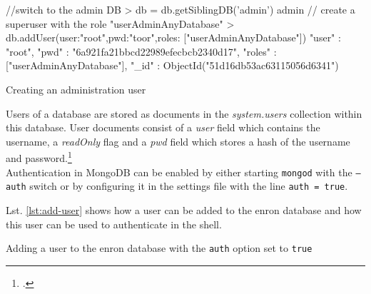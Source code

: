 \begin{listing}
    \begin{javascriptcode}
//switch to the admin DB
> db = db.getSiblingDB('admin')
admin
// create a superuser with the role "userAdminAnyDatabase"
> db.addUser({user:"root",pwd:"toor",roles: ["userAdminAnyDatabase"]})
{
	"user" : "root",
	"pwd" : "6a921fa21bbcd22989efecbcb2340d17",
	"roles" : ["userAdminAnyDatabase"],
	"_id" : ObjectId("51d16db53ac63115056d6341")
}
    \end{javascriptcode}
    \caption{Creating an administration user}
    \label{lst:mongo-root}
\end{listing}

Users of a database are stored as documents in the \textit{system.users} collection
within this database.
User documents consist of a \textit{user} field which contains the username,
a \textit{readOnly} flag and a \textit{pwd} field which stores a hash of the
username and password.\footcite[Cf.][]{mongo_adduser}\\
Authentication in MongoDB can be enabled by either starting \texttt{mongod} with
the \texttt{--auth} switch or by configuring it in the settings file with the
line \texttt{auth = true}.

Lst. \ref{lst:add-user}
shows how a user can be added to the enron database and how this user
can be used to authenticate in the shell.

\begin{listing}
    \caption[Adding a user to the enron database]{Adding a user to the enron
    database with the \texttt{auth} option set to \texttt{true}}
    \label{lst:add-user}
\end{listing}




